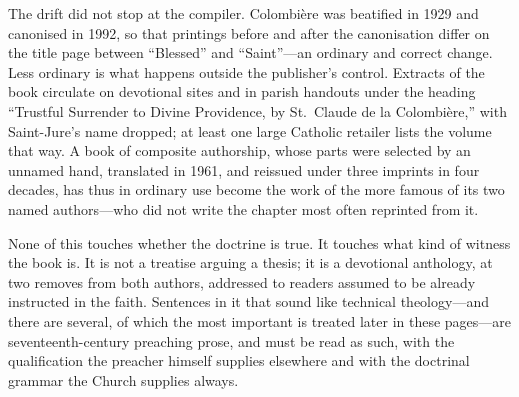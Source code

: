 The drift did not stop at the compiler. Colombière was beatified in 1929 and canonised in 1992, so that printings before and after the canonisation differ on the title page between ``Blessed'' and ``Saint''---an ordinary and correct change. Less ordinary is what happens outside the publisher's control. Extracts of the book circulate on devotional sites and in parish handouts under the heading ``Trustful Surrender to Divine Providence, by St.~Claude de la Colombière,'' with Saint-Jure's name dropped; at least one large Catholic retailer lists the volume that way. A book of composite authorship, whose parts were selected by an unnamed hand, translated in 1961, and reissued under three imprints in four decades, has thus in ordinary use become the work of the more famous of its two named authors---who did not write the chapter most often reprinted from it.

None of this touches whether the doctrine is true. It touches what kind of witness the book is. It is not a treatise arguing a thesis; it is a devotional anthology, at two removes from both authors, addressed to readers assumed to be already instructed in the faith. Sentences in it that sound like technical theology---and there are several, of which the most important is treated later in these pages---are seventeenth-century preaching prose, and must be read as such, with the qualification the preacher himself supplies elsewhere and with the doctrinal grammar the Church supplies always.

